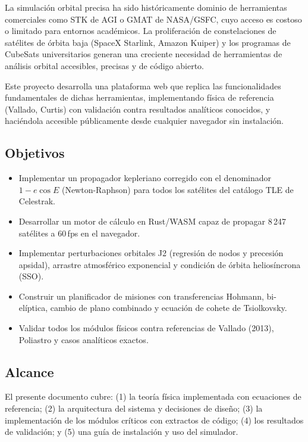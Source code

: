 \documentclass[12pt,a4paper]{article}
\begin{document}
La simulaci\'on orbital precisa ha sido hist\'oricamente dominio de herramientas comerciales como STK de AGI o GMAT de NASA/GSFC, cuyo acceso es costoso o limitado para entornos acad\'emicos. La proliferaci\'on de constelaciones de sat\'elites de \'orbita baja (SpaceX Starlink, Amazon Kuiper) y los programas de CubeSats universitarios generan una creciente necesidad de herramientas de an\'alisis orbital accesibles, precisas y de c\'odigo abierto.

Este proyecto desarrolla una plataforma web que replica las funcionalidades fundamentales de dichas herramientas, implementando f\'isica de referencia (Vallado, Curtis) con validaci\'on contra resultados anal\'iticos conocidos, y haci\'endola accesible p\'ublicamente desde cualquier navegador sin instalaci\'on.

\subsection{Objetivos}

\begin{itemize}[leftmargin=1.5em]
  \item Implementar un propagador kepleriano corregido con el denominador $1 - e\cos E$ (Newton-Raphson) para todos los sat\'elites del cat\'alogo TLE de Celestrak.
  \item Desarrollar un motor de c\'alculo en Rust/WASM capaz de propagar 8\,247 sat\'elites a 60\,fps en el navegador.
  \item Implementar perturbaciones orbitales J2 (regresi\'on de nodos y precesi\'on apsidal), arrastre atmosf\'erico exponencial y condici\'on de \'orbita helios\'incrona (SSO).
  \item Construir un planificador de misiones con transferencias Hohmann, bi-el\'iptica, cambio de plano combinado y ecuaci\'on de cohete de Tsiolkovsky.
  \item Validar todos los m\'odulos f\'isicos contra referencias de Vallado (2013), Poliastro y casos anal\'iticos exactos.
\end{itemize}

\subsection{Alcance}

El presente documento cubre: (1) la teor\'ia f\'isica implementada con ecuaciones de referencia; (2) la arquitectura del sistema y decisiones de dise\~no; (3) la implementaci\'on de los m\'odulos cr\'iticos con extractos de c\'odigo; (4) los resultados de validaci\'on; y (5) una gu\'ia de instalaci\'on y uso del simulador.
\end{document}
